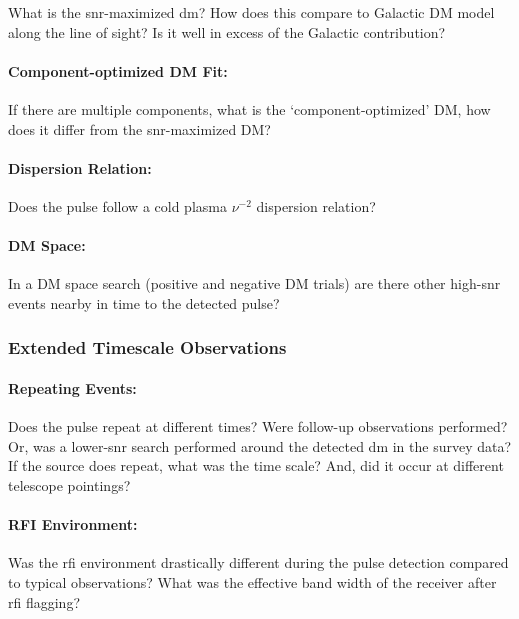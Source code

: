 \documentclass[a4paper,fleqn,usenatbib]{mnras}
\begin{document}
What is the \gls{snr}-maximized \gls{dm}? How does this compare to Galactic DM
model along the line of sight? Is it well in excess of the Galactic
contribution?

\paragraph{Component-optimized DM Fit:}

If there are multiple components, what is the `component-optimized' DM, how does
it differ from the \gls{snr}-maximized DM?

\paragraph{Dispersion Relation:}

Does the pulse follow a cold plasma $\nu^{-2}$ dispersion relation?

\paragraph{DM Space:}

In a DM space search (positive and negative DM trials) are there other
high-\gls{snr} events nearby in time to the detected pulse?

\subsubsection{Extended Timescale Observations}

\paragraph{Repeating Events:}

Does the pulse repeat at different times? Were follow-up observations performed?
Or, was a lower-\gls{snr} search performed around the detected \gls{dm} in the
survey data? If the source does repeat, what was the time scale? And, did it
occur at different telescope pointings?

\paragraph{RFI Environment:}

Was the \gls{rfi} environment drastically different during the pulse detection
compared to typical observations? What was the effective band width of the
receiver after \gls{rfi} flagging?
\end{document}
